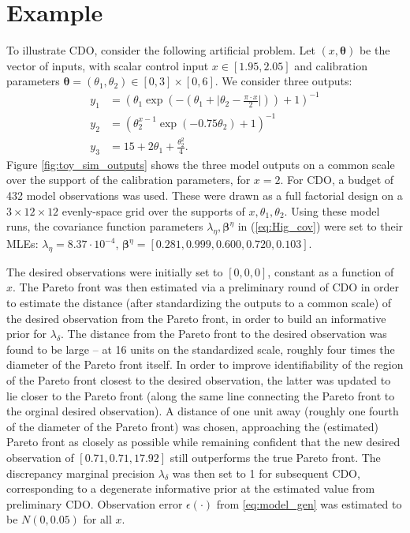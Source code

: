 \documentclass{article}
\begin{document}
\section{Example}\label{example}
To illustrate CDO, consider the following artificial problem. 
%
Let $(x,\boldsymbol \theta)$ be the vector of inputs, with scalar control input $x\in[1.95,2.05]$ and calibration parameters $\boldsymbol \theta = (\theta_1,\theta_2)\in[0,3]\times[0,6]$.
%
We consider three outputs:
%
\begin{equation}\label{eq:toy_sim_outputs}
\begin{aligned}
y_1 &= \left(\theta_1 \exp\left(-\left(\theta_1 + \lvert \theta_2-\frac{\pi\cdot x}2\rvert \right)\right)+1\right)^{-1}\\
y_2 &= \left(\theta_2^{x-1} \exp\left(-0.75 \theta_2\right) + 1 \right)^{-1} \\
y_3 &= 15 + 2 \theta_1 + \frac{\theta_2^2}4.
\end{aligned}
\end{equation}
%
Figure \ref{fig:toy_sim_outputs} shows the three model outputs on a common scale over the support of the calibration parameters, for $x=2$.
%
For CDO, a budget of 432 model observations was used. 
%
These were drawn as a full factorial design on a $3\times12\times12$ evenly-space grid over the supports of $x,\theta_1,\theta_2$. 
%
Using these model runs, the covariance function parameters $\lambda_\eta,\boldsymbol \beta^\eta$ in (\ref{eq:Hig_cov}) were set to their MLEs: $\lambda_\eta = 8.37\cdot10^{-4}$, $\boldsymbol\beta^\eta = [0.281, 0.999, 0.600, 0.720, 0.103]$.


The desired observations were initially set to $[0,0,0]$, constant as a function of $x$. 
%
The Pareto front was then estimated via a preliminary round of CDO in order to estimate the distance (after standardizing the outputs to a common scale) of the desired observation from the Pareto front, in order to build an informative prior for $\lambda_\delta$.
%
The distance from the Pareto front to the desired observation was found to be large -- at 16 units on the standardized scale, roughly four times the diameter of the Pareto front itself. 
%
In order to improve identifiability of the region of the Pareto front closest to the desired observation, the latter was updated to lie closer to the Pareto front (along the same line connecting the Pareto front to the orginal desired observation).
%
A distance of one unit away (roughly one fourth of the diameter of the Pareto front) was chosen, approaching the (estimated) Pareto front as closely as possible while remaining confident that the new desired observation of $[0.71, 0.71, 17.92]$ still outperforms the true Pareto front.
%
The discrepancy marginal precision $\lambda_\delta$ was then set to 1 for subsequent CDO, corresponding to a degenerate informative prior at the estimated value from preliminary CDO.
%
Observation error $\epsilon(\cdot)$ from \eqref{eq:model_gen} was estimated to be $N(0,0.05)$ for all $x$.
\end{document}
